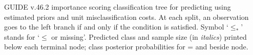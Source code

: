 \documentclass{article}
\begin{document}
GUIDE v.46.2 importance scoring
classification tree for predicting \texttt{} using
estimated priors
and unit misclassification costs.
At each split, an observation goes to the left branch 
 if and only if the condition is satisfied.
 Symbol `$\leq_*$' stands for `$\leq$ or missing'.
Predicted class and sample size (in \emph{italics}) printed below each terminal node;
class posterior probabilities for \texttt{} =
 \texttt{} and \texttt{} beside node.
 
\end{document}
